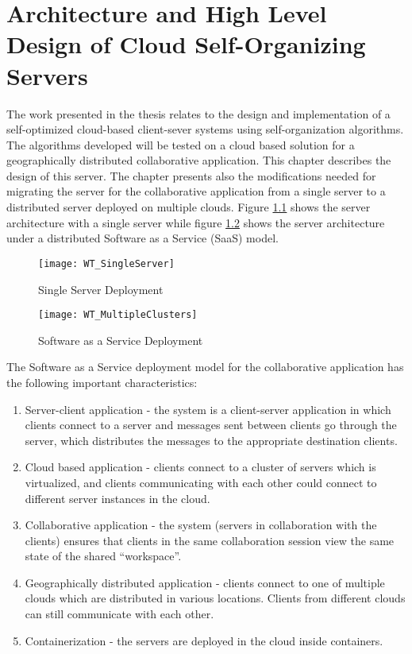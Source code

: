 \chapter{Architecture and High Level Design of Cloud Self-Organizing Servers} %
\label{Chapter3}

The work presented in the thesis relates to the design and implementation of a self-optimized cloud-based client-sever systems using self-organization algorithms. The algorithms developed will be tested on a cloud based solution for a geographically distributed collaborative application. This chapter describes the design of this server. The chapter presents also the modifications needed for migrating the server for the collaborative application from a single server to a distributed server deployed on multiple clouds. Figure \ref{fig:wtsingleserver} shows the server architecture with a single server while figure \ref{fig:wtmultipleservers} shows the server architecture under a distributed Software as a Service (SaaS) model.

\begin{figure}
	\centering
	\texttt{[image: WT\_SingleServer]}
	\caption{Single Server Deployment}
	\label{fig:wtsingleserver}
\end{figure}

\begin{figure}
	\centering
	\texttt{[image: WT\_MultipleClusters]}
	\caption{Software as a Service Deployment}
	\label{fig:wtmultipleservers}
\end{figure}

The Software as a Service deployment model for the collaborative application has the following important characteristics:

\begin{enumerate}
	\item Server-client application - the system is a client-server application in which clients connect to a server and messages sent between clients go through the server, which distributes the messages to the appropriate destination clients.
	\item Cloud based application - clients connect to a cluster of servers which is virtualized, and clients communicating with each other could connect to different server instances in the cloud.
	\item Collaborative application - the system (servers in collaboration with the clients) ensures that clients in the same collaboration session view the same state of the shared ``workspace''. 
	\item Geographically distributed application - clients connect to one of multiple clouds which are distributed in various locations. Clients from different clouds can still communicate with each other.
	\item Containerization - the servers are deployed in the cloud inside containers.
\end{enumerate}

